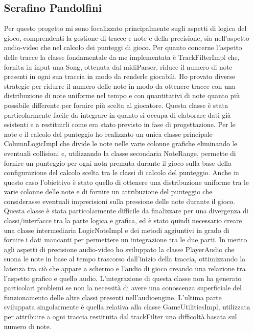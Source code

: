 \documentclass[a4paper,12pt]{report}
\begin{document}
\subsection{Serafino Pandolfini}
Per questo progetto mi sono focalizzato principalmente sugli aspetti di logica del gioco, comprendenti la gestione di tracce e note e della precisione, sia nell'aspetto audio-video che nel calcolo dei punteggi di gioco. Per quanto concerne l'aspetto delle tracce la classe fondamentale da me implementata è TrackFilterImpl che, fornita in input una Song, ottenuta dal midiParser, riduce il numero di note presenti in ogni sua traccia in modo da renderle giocabili. Ho provato diverse strategie per ridurre il numero delle note in modo da ottenere tracce con una distribuzione di note uniforme nel tempo e con quantitativi di note quanto più possibile differente per fornire più scelta al giocatore. Questa classe è stata particolarmente facile da integrare in quanto si occupa di elaborare dati già esistenti e a restituirli come era stato previsto in fase di progettazione. Per le note e il calcolo del punteggio ho realizzato un unica classe principale ColumnLogicImpl che divide le note nelle varie colonne grafiche eliminando le eventuali collisioni e, utilizzando la classe secondaria NoteRange, permette di fornire un punteggio per ogni nota premuta durante il gioco sulla base della configurazione del calcolo scelta tra le classi di calcolo del punteggio. Anche in questo caso l'obiettivo è stato quello di ottenere una distribuzione uniforme tra le varie colonne delle note e di fornire un attribuzione del punteggio che considerasse eventuali imprecisioni sulla pressione delle note durante il gioco. Questa classe è stata particolarmente difficile da finalizzare per una divergenza di classi/interfacce tra la parte logica e grafica, ed è stato quindi necessario creare una classe intermediaria LogicNoteImpl e dei metodi aggiuntivi in grado di fornire i dati mancanti per permettere un integrazione tra le due parti.  
In merito agli aspetti di precisione audio-video ho sviluppato la classe PlayerAudio che suona le note in base al tempo trascorso dall'inizio della traccia, ottimizzando la latenza tra ciò che appare a schermo e l'audio di gioco creando una relazione tra l'aspetto grafico e quello audio.
L'integrazione di questa classe non ha generato particolari problemi se non la necessità di avere una conoscenza superficiale del funzionamento delle altre classi presenti nell'audioengine.
L'ultima parte sviluppata singolarmente è quella relativa alla classe GameUtilitiesImpl, utilizzata per attribuire a ogni traccia restituita dal trackFilter una difficoltà basata sul numero di note.
\end{document}
